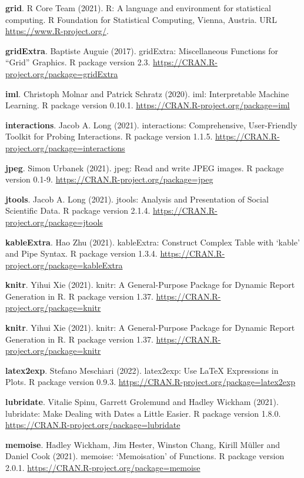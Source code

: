\documentclass[
  11pt,
]{scrbook}
\begin{document}
\textbf{grid}. R Core Team (2021). R: A language and environment for statistical computing. R Foundation for Statistical Computing, Vienna, Austria. URL \url{https://www.R-project.org/}.

\textbf{gridExtra}. Baptiste Auguie (2017). gridExtra: Miscellaneous Functions for ``Grid'' Graphics. R package version 2.3. \url{https://CRAN.R-project.org/package=gridExtra}

\textbf{iml}. Christoph Molnar and Patrick Schratz (2020). iml: Interpretable Machine Learning. R package version 0.10.1. \url{https://CRAN.R-project.org/package=iml}

\textbf{interactions}. Jacob A. Long (2021). interactions: Comprehensive, User-Friendly Toolkit for Probing Interactions. R package version 1.1.5. \url{https://CRAN.R-project.org/package=interactions}

\textbf{jpeg}. Simon Urbanek (2021). jpeg: Read and write JPEG images. R package version 0.1-9. \url{https://CRAN.R-project.org/package=jpeg}

\textbf{jtools}. Jacob A. Long (2021). jtools: Analysis and Presentation of Social Scientific Data. R package version 2.1.4. \url{https://CRAN.R-project.org/package=jtools}

\textbf{kableExtra}. Hao Zhu (2021). kableExtra: Construct Complex Table with `kable' and Pipe Syntax. R package version 1.3.4. \url{https://CRAN.R-project.org/package=kableExtra}

\textbf{knitr}. Yihui Xie (2021). knitr: A General-Purpose Package for Dynamic Report Generation in R. R package version 1.37. \url{https://CRAN.R-project.org/package=knitr}

\textbf{knitr}. Yihui Xie (2021). knitr: A General-Purpose Package for Dynamic Report Generation in R. R package version 1.37. \url{https://CRAN.R-project.org/package=knitr}

\textbf{latex2exp}. Stefano Meschiari (2022). latex2exp: Use LaTeX Expressions in Plots. R package version 0.9.3. \url{https://CRAN.R-project.org/package=latex2exp}

\textbf{lubridate}. Vitalie Spinu, Garrett Grolemund and Hadley Wickham (2021). lubridate: Make Dealing with Dates a Little Easier. R package version 1.8.0. \url{https://CRAN.R-project.org/package=lubridate}

\textbf{memoise}. Hadley Wickham, Jim Hester, Winston Chang, Kirill Müller and Daniel Cook (2021). memoise: `Memoisation' of Functions. R package version 2.0.1. \url{https://CRAN.R-project.org/package=memoise}
\end{document}
